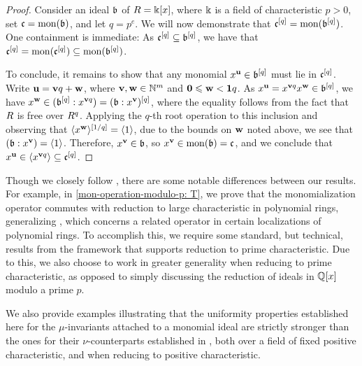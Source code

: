 \documentclass{amsart}
\begin{document}
\begin{proof}  Consider an ideal $\mathfrak{b}$ of $R=\Bbbk[x]$, where $\Bbbk$ is a field of characteristic $p>0$, set $\mathfrak{c} = \operatorname{mon}(\mathfrak{b})$, and let $q=p^e$.  We will now demonstrate that $\mathfrak{c}^{[q]} = \operatorname{mon}(\mathfrak{b}^{[q]})$.  One containment is immediate:   As $\mathfrak{c}^{[q]} \subseteq \mathfrak{b}^{[q]}$, we have that $\mathfrak{c}^{[q]} = \operatorname{mon}(\mathfrak{c}^{[q]}) \subseteq \operatorname{mon}(\mathfrak{b}^{[q]})$.
   
   To conclude, it remains to show that any monomial $x^{\mathbf{u}} \in \mathfrak{b}^{[q]}$ must lie in $\mathfrak{c}^{[q]}$.
   Write $\mathbf{u} = \mathbf{v}q + \mathbf{w}$, where $\mathbf{v}, \mathbf{w} \in \mathbb{N}^m$ and $\mathbf{0} \leqslant \mathbf{w} < \mathbf{1}q$.
   As $x^{\mathbf{u}} = x^{\mathbf{v}q} x^{\mathbf{w}} \in \mathfrak{b}^{[q]}$, we have $x^{\mathbf{w}} \in ( \mathfrak{b}^{[q]}: x^{\mathbf{v}q}) = (\mathfrak{b}:x^{\mathbf{v}})^{[q]}$, where the equality follows from the fact that $R$ is free over $R^q$.
   Applying the $q$-th root operation to this inclusion and observing that $\langle x^{\mathbf{w}} \rangle^{[1/q]} = \langle 1 \rangle$, due to the bounds on $\mathbf{w}$ noted above, we see that $ (\mathfrak{b}: x^{\mathbf{v}}) = \langle 1 \rangle$.
   Therefore, $x^{\mathbf{v}} \in \mathfrak{b}$, so $x^{\mathbf{v}} \in \operatorname{mon}(\mathfrak{b}) = \mathfrak{c}$, and we conclude that $x^{\mathbf{u}} \in \langle x^{\mathbf{v}q} \rangle \subseteq \mathfrak{c}^{[q]}$.
\end{proof}

Though we closely follow \cite{budur+mustata+saito.roots_bs_polys_monomial}, there are some notable differences between our results.   For example, in \cref{mon-operation-modulo-p: T}, we prove that the monomialization operator commutes with reduction to large characteristic in polynomial rings, generalizing \cite[Lemma 6.2]{budur+mustata+saito.roots_bs_polys_monomial}, which concerns a related operator in certain localizations of polynomial rings.  To accomplish this, we require some standard, but technical, results from the framework that supports reduction to prime characteristic.
Due to this, we also choose to work in greater generality when reducing to prime characteristic, as opposed to simply discussing the reduction of ideals in $\mathbb{Q}[x]$ modulo a prime $p$.


We also provide examples illustrating that the uniformity properties established here for the $\mu$-invariants attached to a monomial ideal are strictly stronger than the ones for their $\nu$-counterparts established in \loccit, both over a field of fixed positive characteristic, and when reducing to positive characteristic.  
\end{document}
